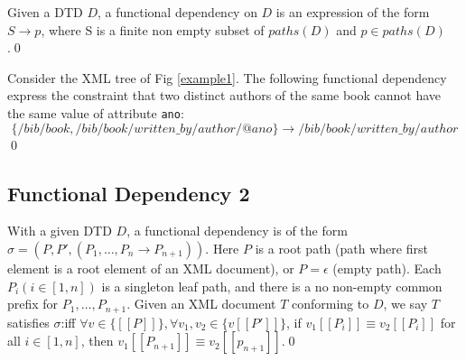 \begin{define}\label{fd1}
Given a DTD $D$, a functional dependency on $D$ is an expression of the form $S \rightarrow p$, where S is a finite non empty subset of $paths(D)$ and $p \in paths(D)$.\qed
\end{define}

\begin{example}
Consider the XML tree of Fig \ref{example1}. The following functional dependency express the constraint that two distinct authors of the same book cannot have the same value of attribute \texttt{ano}:$$\{/bib/book, /bib/book/written\_by/author/@ano\} \rightarrow /bib/book/written\_by/author$$\qed
\end{example}

\subsection{Functional Dependency 2}

\begin{define}\label{fd2}
With a given DTD $D$, a functional dependency is of the form $\sigma = (P, P', (P_1, \dots, P_n \rightarrow P_{n+1}))$. Here $P$ is a  root path (path where first element is a root element of an XML document), or $P = \epsilon$ (empty path). Each $P_i (i \in [1,n])$ is a singleton leaf path, and there is a no non-empty common prefix for $P_1, \dots, P_{n+1}$. Given an XML document $T$ conforming to $D$, we say $T$ satisfies $\sigma$:iff $\forall v \in \{[\![P]\!]\}, \forall v_1, v_2 \in \{v[\![P']\!]\}$, if $v_1[\![P_i]\!] \equiv v_2[\![P_i]\!]$ for all $i \in [1,n]$, then $v_1[\![P_{n+1}]\!] \equiv v_2[\![p_{n+1}]\!]$.\qed
\end{define}
